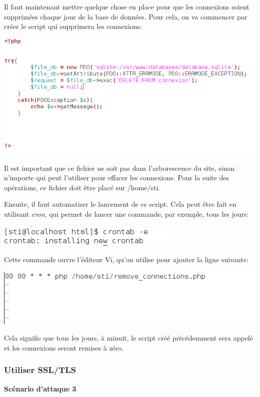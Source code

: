 \documentclass{article}
\begin{document}
Il faut maintenant mettre quelque chose en place pour que les connexions
soient supprimées chaque jour de la base de données. Pour cela, on va
commencer par créer le script qui supprimera les connexions:

\includegraphics{images/tentative_remove_connection.PNG}

Il est important que ce fichier ne soit pas dans l'arborescence du site,
sinon n'importe qui peut l'utiliser pour effacer les connexions. Pour la
suite des opérations, ce fichier doit être placé sur /home/sti.

Ensuite, il faut automatiser le lancement de ce script. Cela peut être
fait en utilisant \emph{cron}, qui permet de lancer une commande, par
exemple, tous les jours:

\includegraphics{images/tentative_crontab.PNG}

Cette commande ouvre l'éditeur Vi, qu'on utilise pour ajouter la ligne
suivante:

\includegraphics{images/tentative_crontab_detail.PNG}

Cela signifie que tous les jours, à minuit, le script créé précédemment
sera appelé et les connexions seront remises à zéro.

\subsubsection{Utiliser SSL/TLS}

\textbf{Scénario d'attaque 3}
\end{document}
